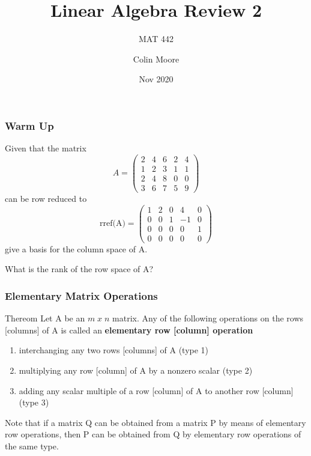 \documentclass[11pt]{beamer}
\begin{document}
	\author{Colin Moore}
	\title{Linear Algebra Review 2}
	\subtitle{MAT 442}
	\date{Nov 2020}
	\subject{MAT 442}
	\begin{frame}[plain]
		\maketitle
	\end{frame}

\begin{frame}
	\frametitle{Warm Up}
	Given that the matrix
	\[ A = 
		\begin{pmatrix}
			2 & 4 & 6 & 2 & 4 \\
			1 & 2 & 3 & 1 & 1 \\
			2 & 4 & 8 & 0 & 0 \\
			3 & 6 & 7 & 5 & 9
		\end{pmatrix}
	\]
	can be row reduced to
	\[ \text{rref(A)} = 
		\begin{pmatrix}
			1 & 2 & 0 & 4 & 0 \\
			0 & 0 & 1 & -1 & 0 \\
			0 & 0 & 0 & 0 & 1 \\
			0 & 0 & 0 & 0 & 0
		\end{pmatrix}
	\]
	give a basis for the column space of A.
	
	What is the rank of the row space of A?
\end{frame}

\begin{frame}
	\frametitle{Elementary Matrix Operations}
	\begin{block}{Thereom}
		Let A be an $m \; x \; n$ matrix. Any of the following operations on the rows [columns] of A is called an \textbf{elementary row [column] operation }
		\begin{enumerate}
			\item interchanging any two rows [columns] of A (type 1)
			\item multiplying any row [column] of A by a nonzero scalar (type 2)
			\item adding any scalar multiple of a row [column] of A to another row [column] (type 3)
		\end{enumerate}
	\end{block}

	Note that if a matrix Q can be obtained from a matrix P by means of elementary row operations, then P can be obtained from Q by elementary row operations of the same type.
\end{frame}
\end{document}
